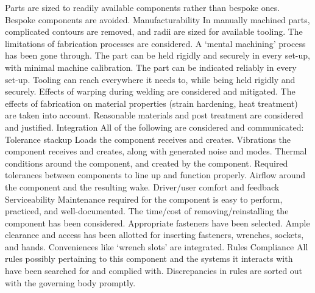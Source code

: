 \documentclass[letterpaper]{article}
\begin{document}
\begin{outline}
	\2 Parts are sized to readily available components rather than bespoke ones. Bespoke components are avoided.
\1 Manufacturability
	\2 In manually machined parts, complicated contours are removed, and radii are sized for available tooling.
	\2 The limitations of fabrication processes are considered.    
	\2 A ‘mental machining’ process has been gone through.
	\2 The part can be held rigidly and securely in every set-up, with minimal machine calibration.
	\2 The part can be indicated reliably in every set-up.
	\2 Tooling can reach everywhere it needs to, while being held rigidly and securely.
	\2 Effects of warping during welding are considered and mitigated.
	\2 The effects of fabrication on material properties (strain hardening, heat treatment) are taken into account.
	\2 Reasonable materials and post treatment are considered and justified.
\1 Integration
	\2 All of the following are considered and communicated:
		\3 Tolerance stackup
		\3 Loads the component receives and creates.
		\3 Vibrations the component receives and creates, along with generated noise and modes.
		\3 Thermal conditions around the component, and created by the component.
		\3 Required tolerances between components to line up and function properly.
		\3 Airflow around the component and the resulting wake.
		\3 Driver/user comfort and feedback
\1 Serviceability
	\2 Maintenance required for the component is easy to perform, practiced, and well-documented. 
	\2 The time/cost of removing/reinstalling the component has been considered. Appropriate fasteners have been selected.
	\2 Ample clearance and access has been allotted for inserting fasteners, wrenches, sockets, and hands. Conveniences like ‘wrench slots’ are integrated.
\1 Rules Compliance
	\2 All rules possibly pertaining to this component and the systems it interacts with have been searched for and complied with.
	\2 Discrepancies in rules are sorted out with the governing body promptly.
\end{outline}
\end{document}
